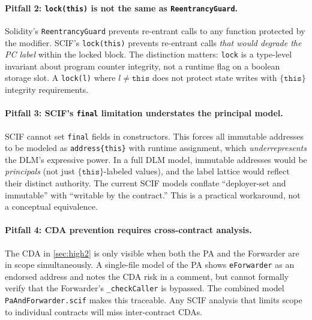 \documentclass[11pt,a4paper]{article}
\begin{document}
\paragraph{Pitfall 2: \texttt{lock(this)} is not the same as \texttt{ReentrancyGuard}.}
Solidity's \texttt{ReentrancyGuard} prevents re-entrant calls to any function
protected by the modifier. SCIF's \texttt{lock(this)} prevents re-entrant calls
\emph{that would degrade the PC label} within the locked block. The distinction
matters: \texttt{lock} is a type-level invariant about program counter integrity,
not a runtime flag on a boolean storage slot. A \texttt{lock(l)} where
$l \neq \texttt{this}$ does not protect state writes with $\{\texttt{this}\}$
integrity requirements.

\paragraph{Pitfall 3: SCIF's \texttt{final} limitation understates the principal model.}
SCIF cannot set \texttt{final} fields in constructors. This forces all
immutable addresses to be modeled as \texttt{address\{this\}} with runtime
assignment, which \emph{underrepresents} the DLM's expressive power. In a full
DLM model, immutable addresses would be \emph{principals} (not just
$\{\texttt{this}\}$-labeled values), and the label lattice would reflect their
distinct authority. The current SCIF models conflate ``deployer-set and
immutable'' with ``writable by the contract.'' This is a practical workaround,
not a conceptual equivalence.

\paragraph{Pitfall 4: CDA prevention requires cross-contract analysis.}
The CDA in \cref{sec:high2} is only visible when both the PA and the Forwarder
are in scope simultaneously. A single-file model of the PA shows
\texttt{eForwarder} as an endorsed address and notes the CDA risk in a comment,
but cannot formally verify that the Forwarder's \texttt{\_checkCaller} is
bypassed. The combined model \texttt{PaAndForwarder.scif} makes this traceable.
Any SCIF analysis that limits scope to individual contracts will miss inter-contract
CDAs.
\end{document}
